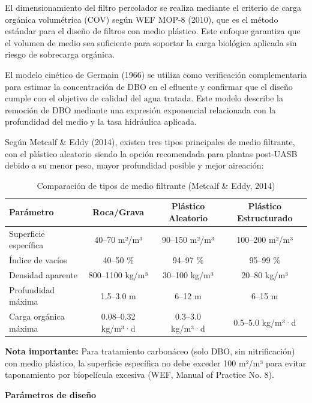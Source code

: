 \documentclass[12pt,a4paper]{article}
\begin{document}
El dimensionamiento del filtro percolador se realiza mediante el criterio de carga orgánica volumétrica (COV) según WEF MOP-8 (2010), que es el método estándar para el diseño de filtros con medio plástico. Este enfoque garantiza que el volumen de medio sea suficiente para soportar la carga biológica aplicada sin riesgo de sobrecarga orgánica.

El modelo cinético de Germain (1966) se utiliza como verificación complementaria para estimar la concentración de DBO en el efluente y confirmar que el diseño cumple con el objetivo de calidad del agua tratada. Este modelo describe la remoción de DBO mediante una expresión exponencial relacionada con la profundidad del medio y la tasa hidráulica aplicada.



Según Metcalf \& Eddy (2014), existen tres tipos principales de medio filtrante, con el plástico aleatorio siendo la opción recomendada para plantas post-UASB debido a su menor peso, mayor profundidad posible y mejor aireación:

\begin{table}[H]
\centering
\caption{Comparación de tipos de medio filtrante (Metcalf \& Eddy, 2014)}
\small
\begin{tabular}{lccc}
\toprule
\textbf{Parámetro} & \textbf{Roca/Grava} & \textbf{Plástico Aleatorio} & \textbf{Plástico Estructurado} \\
\midrule
Superficie específica & 40--70 m²/m³ & 90--150 m²/m³ & 100--200 m²/m³ \\
Índice de vacíos & 40--50 \% & 94--97 \% & 95--99 \% \\
Densidad aparente & 800--1100 kg/m³ & 30--100 kg/m³ & 20--80 kg/m³ \\
Profundidad máxima & 1.5--3.0 m & 6--12 m & 6--15 m \\
Carga orgánica máxima & 0.08--0.32 kg/m³·d & 0.3--3.0 kg/m³·d & 0.5--5.0 kg/m³·d \\
\bottomrule
\end{tabular}
\end{table}

\textbf{Nota importante:} Para tratamiento carbonáceo (solo DBO, sin nitrificación) con medio plástico, la superficie específica no debe exceder 100 m²/m³ para evitar taponamiento por biopelícula excesiva (WEF, Manual of Practice No. 8).

\textbf{Parámetros de diseño}
\end{document}
